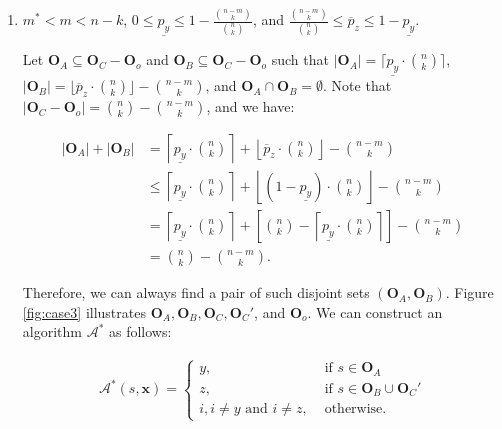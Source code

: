 \documentclass[letterpaper]{article} %
\begin{document}
\begin{enumerate}[label={\bfseries Case \arabic*:}, wide=0pt]
  \item $m^* < m < n-k$, $0\le \underline{p_y} \le 1-\frac{{n-m \choose k}}{{n \choose k}}$, and $\frac{{n-m \choose k}}{{n \choose k}}\le\overline{p}_z \le 1-\underline{p_y}$.

Let $\mathbf{O}_A\subseteq \mathbf{O}_C-\mathbf{O}_o$  and $\mathbf{O}_B\subseteq \mathbf{O}_C-\mathbf{O}_o$ such that $|\mathbf{O}_A|=\lceil\underline{p_y} \cdot {n \choose k}\rceil$, $|\mathbf{O}_B|=\lfloor\overline{p}_z \cdot {n \choose k}\rfloor - {n-m \choose k}$, and $\mathbf{O}_A \cap \mathbf{O}_B=\emptyset$. Note that $|\mathbf{O}_C-\mathbf{O}_o| = {n \choose k}-{n-m \choose k}$, and we have:

\begin{align}
|\mathbf{O}_A|+|\mathbf{O}_B| &= \left\lceil\underline{p_y} \cdot {n \choose k}\right\rceil + \left\lfloor\overline{p}_z \cdot {n \choose k}\right\rfloor - {n-m \choose k} \\
							&\le \left\lceil\underline{p_y} \cdot {n \choose k}\right\rceil + \left\lfloor(1-\underline{p_y}) \cdot {n \choose k}\right\rfloor - {n-m \choose k} \\
							&= \left\lceil\underline{p_y} \cdot {n \choose k}\right\rceil + \left[{n \choose k} - \left\lceil\underline{p_y} \cdot {n \choose k}\right\rceil\right] -{n-m \choose k} \\
							&= {n \choose k} - {n-m \choose k}.
\end{align}

Therefore, we can always find a pair of such disjoint sets $(\mathbf{O}_A, \mathbf{O}_B)$. Figure \ref{fig:case3} illustrates $\mathbf{O}_A, \mathbf{O}_B,\mathbf{O}_C, \mathbf{O}_C'$, and $\mathbf{O}_o$. We can  construct an algorithm $\mathcal{A}^*$ as follows:

	\begin{align}
		\mathcal{A}^*(s,\mathbf{x})=
		\begin{cases}
 			y, &\text{ if } s\in \mathbf{O}_A\\
			z, &\text{ if } s\in \mathbf{O}_B\cup\mathbf{O}_C'\\
 			i, i\neq y \text{ and } i\neq z, &\text{ otherwise}.
		\end{cases}
	\end{align}


\end{enumerate}
\end{document}
